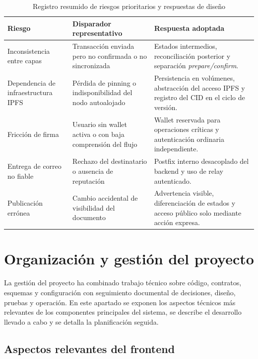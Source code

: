 \documentclass[11pt, a4paper]{article}
\begin{document}
\begin{table}[H]
    \centering
    \small
    \begin{tabular}{|p{3.1cm}|p{3.8cm}|p{6.2cm}|}
    \hline
    \textbf{Riesgo} & \textbf{Disparador representativo} & \textbf{Respuesta adoptada} \\
    \hline
    Inconsistencia entre capas & Transacción enviada pero no confirmada o no sincronizada & Estados intermedios, reconciliación posterior y separación \textit{prepare/confirm}. \\
    \hline
    Dependencia de infraestructura IPFS & Pérdida de pinning o indisponibilidad del nodo autoalojado & Persistencia en volúmenes, abstracción del acceso IPFS y registro del CID en el ciclo de versión. \\
    \hline
    Fricción de firma & Usuario sin wallet activa o con baja comprensión del flujo & Wallet reservada para operaciones críticas y autenticación ordinaria independiente. \\
    \hline
    Entrega de correo no fiable & Rechazo del destinatario o ausencia de reputación & Postfix interno desacoplado del backend y uso de relay autenticado. \\
    \hline
    Publicación errónea & Cambio accidental de visibilidad del documento & Advertencia visible, diferenciación de estados y acceso público solo mediante acción expresa. \\
    \hline
    \end{tabular}
    \caption{Registro resumido de riesgos prioritarios y respuestas de diseño}
    \label{tab:registro-riesgos-memoria}
\end{table}

\section{Organización y gestión del proyecto}

La gestión del proyecto ha combinado trabajo técnico sobre código, contratos, esquemas y configuración con seguimiento documental de decisiones, diseño, pruebas y operación. En este apartado se exponen los aspectos técnicos más relevantes de los componentes principales del sistema, se describe el desarrollo llevado a cabo y se detalla la planificación seguida.

\subsection{Aspectos relevantes del frontend}
\end{document}
